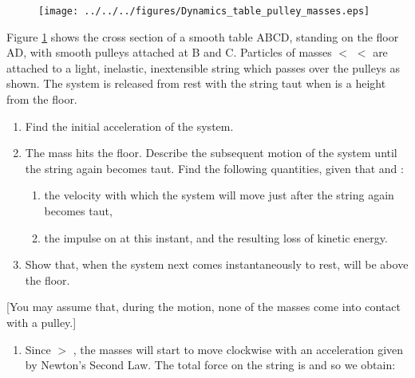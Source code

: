 
\begin{problem}[A1969AMIIQ2a] %
{\begin{figure}[h]
\centering
\texttt{[image: ../../../figures/Dynamics\_table\_pulley\_masses.eps]}
\caption{}\label{fig:Dynamics_table_pulley_masses}
\end{figure}

Figure \ref{fig:Dynamics_table_pulley_masses} shows the cross section of a smooth table ABCD, standing on the floor AD, with smooth pulleys attached at B and C. Particles of masses  $<$  $<$  are attached to a light, inelastic, inextensible string which passes over the pulleys as shown. The system is released from rest with the string taut when  is a height  from the floor.
\begin{enumerate}
	\item Find the initial acceleration of the system.
	\item The mass  hits the floor. Describe the subsequent motion of the system until the string again becomes taut. Find the following quantities, given that    and :
	\begin{enumerate}
		\item the velocity with which the system will move just after the string again becomes taut,
		\item the impulse on  at this instant, and the resulting loss of kinetic energy.
	\end{enumerate}
	\item Show that, when the system next comes instantaneously to rest,  will be  above the floor.
\end{enumerate}
[You may assume that, during the motion, none of the masses come into contact with a pulley.]
}
{}
{\begin{enumerate}
	\item Since  $>$ , the masses will start to move clockwise with an acceleration given by Newton's Second Law. The total force on the string is  and so we obtain:

\end{enumerate}}
\end{problem}
